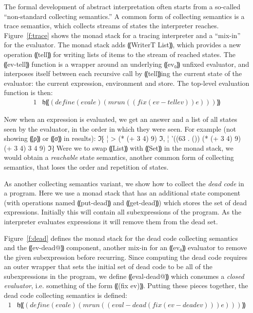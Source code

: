 The formal development of abstract interpretation often starts from a so-called
``non-standard collecting semantics.''  A common form of collecting semantics
is a trace semantics, which collects streams of states the interpreter reaches.
Figure~\ref{f:trace} shows the monad stack for a tracing interpreter and a
``mix-in'' for the evaluator.  The monad stack adds ⸨WriterT List⸩, which
provides a new operation ⸨tell⸩ for writing lists of items to the stream of
reached states.  The ⸨ev-tell⸩ function is a wrapper around an underlying
⸨ev₀⸩ unfixed evaluator, and interposes itself between each recursive call by
⸨tell⸩ing the current state of the evaluator: the current expression,
environment and store.  The top-level evaluation function is then:
\begin{alignat*}{1}
&𝔥⸨(define (eval e) (mrun ((fix (ev-tell ev)) e)))⸩
\end{alignat*}

Now when an expression is evaluated, we get an answer and a list of all states
seen by the evaluator, in the order in which they were seen. For example (not
showing ⸨ρ⸩ or ⸨σ⸩ in results):
ℑ⁅
¦ > (* (+ 3 4) 9)
ℑ,
¦ '((63 . ()) (* (+ 3 4) 9) (+ 3 4) 3 4 9)
ℑ⁆
Were we to swap ⸨List⸩ with ⸨Set⸩ in the monad stack, we would obtain a
\emph{reachable} state semantics, another common form of collecting semantics,
that loses the order and repetition of states.

As another collecting semantics variant, we show how to collect the \emph{dead
code} in a program.  Here we use a monad stack that has an additional state
component (with operations named ⸨put-dead⸩ and ⸨get-dead⸩) which stores the
set of dead expressions.  Initially this will contain all subexpressions of the
program.  As the interpreter evaluates expressions it will remove them from the
dead set.

Figure~\ref{f:dead} defines the monad stack for the dead code collecting
semantics and the ⸨ev-dead@⸩ component, another mix-in for an ⸨ev₀⸩ evaluator
to remove the given subexpression before recurring.  Since computing the dead
code requires an outer wrapper that sets the initial set of dead code to be all
of the subexpressions in the program, we define ⸨eval-dead@⸩ which consumes a
\emph{closed evaluator}, i.e. something of the form ⸨(fix ev)⸩. Putting these
pieces together, the dead code collecting semantics is defined:
\begin{alignat*}{1}
  & 𝔥⸨(define (eval e) (mrun ((eval-dead (fix (ev-dead ev))) e)))⸩
\end{alignat*}

